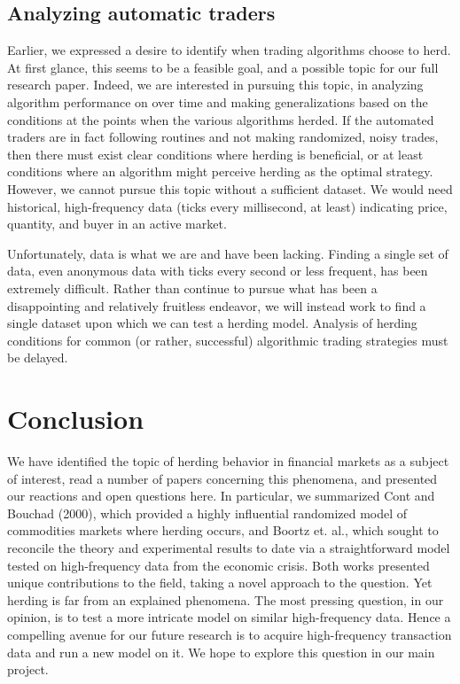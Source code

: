 \documentclass{article}
\begin{document}
\subsection{Analyzing automatic traders}
Earlier, we expressed a desire to identify when trading algorithms choose to herd.
At first glance, this seems to be a feasible goal, and a possible topic for our full research paper. 
Indeed, we are interested in pursuing this topic, in analyzing algorithm performance on over time and making generalizations based on the conditions at the points when the various algorithms herded. 
If the automated traders are in fact following routines and not making randomized, noisy trades, then there must exist clear conditions where herding is beneficial, or at least conditions where an algorithm might perceive herding as the optimal strategy.
However, we cannot pursue this topic without a sufficient dataset.
We would need historical, high-frequency data (ticks every millisecond, at least) indicating price, quantity, and buyer in an active market. 

Unfortunately, data is what we are and have been lacking. 
Finding a single set of data, even anonymous data with ticks every second or less frequent, has been extremely difficult. 
Rather than continue to pursue what has been a disappointing and relatively fruitless endeavor, we will instead work to find a single dataset upon which we can test a herding model. 
Analysis of herding conditions for common (or rather, successful) algorithmic trading strategies must be delayed.

\section{Conclusion}
We have identified the topic of herding behavior in financial markets as a subject of interest, read a number of papers concerning this phenomena, and presented our reactions and open questions here.
In particular, we summarized Cont and Bouchad (2000), which provided a highly influential randomized model of commodities markets where herding occurs, and Boortz et. al., which sought to reconcile the theory and experimental results to date via a straightforward model tested on high-frequency data from the economic crisis.
Both works presented unique contributions to the field, taking a novel approach to the question. 
Yet herding is far from an explained phenomena.
The most pressing question, in our opinion, is to test a more intricate model on similar high-frequency data.
Hence a compelling avenue for our future research is to acquire high-frequency transaction data and run a new model on it.
We hope to explore this question in our main project.



\end{document}
